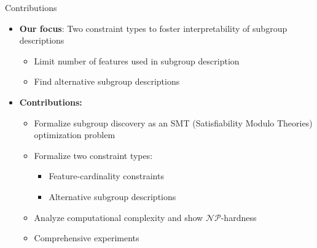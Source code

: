 \documentclass[en, navbaroff]{sdqbeamer}
\begin{document}
\begin{frame}[t]{Contributions}
	\begin{itemize}
		\item \textbf{Our focus}: Two constraint types to foster interpretability of subgroup descriptions
		\begin{itemize}
			\item Limit number of features used in subgroup description
			\item Find alternative subgroup descriptions
		\end{itemize}
		\pause
		\vspace{\baselineskip}
		\item \textbf{Contributions:}
		\begin{itemize}
			\item Formalize subgroup discovery as an SMT (Satisfiability Modulo Theories) optimization problem
			\item Formalize two constraint types:
			\begin{itemize}
				\item Feature-cardinality constraints
				\item Alternative subgroup descriptions
			\end{itemize}
			\item Analyze computational complexity and show $\mathcal{NP}$-hardness
			\item Comprehensive experiments
		\end{itemize}
	\end{itemize}
\end{frame}
\end{document}
